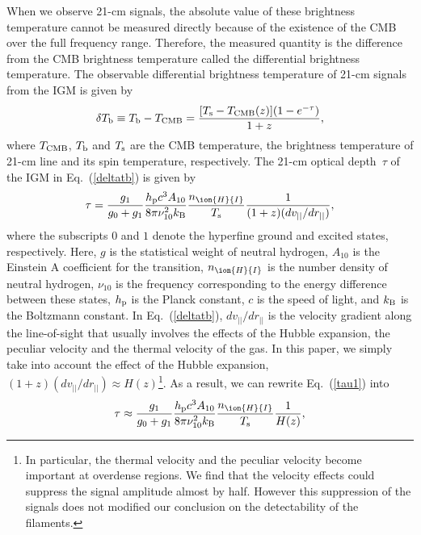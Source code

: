 \documentclass[a4paper,fleqn,usenatbib,useAMS]{mnras}
\begin{document}
When we observe 21-cm signals, the absolute value of these brightness
temperature cannot be measured
directly because of the existence of the CMB over the full frequency range.
Therefore, the measured quantity is the difference from the CMB
brightness temperature called the differential brightness temperature.
The observable differential brightness temperature of 21-cm signals from
the IGM is given by~\citep{1997ApJ...475..429M,Furlanetto2006}
\begin{align}
	\delta T_{\rm{b}}\equiv T_{\rm{b}}-T_{\rm{CMB}}=\frac{[T_{\rm s}-T_{\rm{CMB}}(z)](1-e^{-	\tau})}{1+z},
	\label{deltatb}
\end{align}
where $T_{\rm CMB}$, $T_{\rm{b}}$ and ${T_{\rm s}}$
are the CMB temperature, the brightness temperature of  21-cm
line and its spin temperature, respectively. 
The 21-cm optical depth~$\tau$ of the IGM in Eq.~(\ref{deltatb}) is given by 
\begin{align}
	\tau=\frac{g_{1}}{g_{0}+g_{1}}\frac{h_{\rm{p}} c^{3} A_{10}}{8\pi \nu_{10}^{2} 
	k_{\rm{B}}}\frac{n_{\ion{H}{I}}}{T_{\rm s}}\frac{1}{(1+z)(dv_{||}/dr_{||})}, 
	\label{tau1}
\end{align}
where the subscripts $0$ and $1$ denote the hyperfine ground and excited states, respectively. 
Here, $g$ is the statistical weight of neutral hydrogen, $A_{10}$ is the
Einstein A coefficient for the transition, $n_{\ion{H}{I}}$ is the
number density of neutral hydrogen,
$\nu_{10}$ is the frequency corresponding to the energy difference between these states, $h_{\rm{p}}$ is the Planck constant, $c$ is the speed of light, and $k_{\rm{B}}$ is the Boltzmann constant.
In Eq.~(\ref{deltatb}), $dv_{||}/dr_{||}$ is the velocity gradient along
the line-of-sight that usually involves the effects of the Hubble
expansion, the peculiar velocity and the thermal velocity of the gas. 
In this paper,
we simply take into account the effect of the Hubble expansion,
$(1+z)(dv_{||}/dr_{||}) \approx H(z)$\footnote{In particular, the thermal velocity and the peculiar velocity
become important at overdense regions. We find that the velocity effects
could suppress the signal amplitude almost by
half. However this suppression of the signals does not modified our conclusion on the detectability of the filaments.}. 
As a result, we can rewrite Eq.~(\ref{tau1}) into 
\begin{align}
	\tau \approx \frac{g_{1}}{g_{0}+g_{1}}\frac{h_{\rm{p}} c^{3} A_{10}}{8\pi \nu_{10}^{2} 	
	k_{\rm{B}}}\frac{n_{\ion{H}{I}}}{T_{\rm s}}\frac{1}{H(z)}, 
	\label{tau2}
\end{align}
\end{document}

